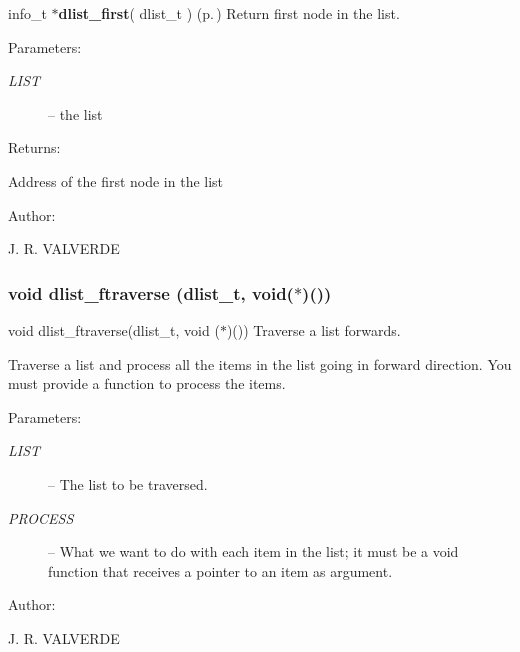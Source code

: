 info\_\-t $\ast${\bf dlist\_\-first}( dlist\_\-t ) {\rm (p.\,\pageref{P__dlist_8h_a10})} Return first node in the list.

\begin{Desc}
\item[Parameters: ]\par
\begin{description}
\item[{\em 
LIST}]-- the list \end{description}
\end{Desc}
\begin{Desc}
\item[Returns: ]\par
Address of the first node in the list\end{Desc}
\begin{Desc}
\item[Author: ]\par
J. R. VALVERDE \end{Desc}
\subsubsection{\setlength{\rightskip}{0pt plus 5cm}void dlist\_\-ftraverse ({\bf dlist\_\-t}, void($\ast$)())}\label{P__dlist_8h_a19}


void dlist\_\-ftraverse(dlist\_\-t, void ($\ast$)()) Traverse a list forwards.

Traverse a list and process all the items in the list going in forward direction. You must provide a function to process the items.\begin{Desc}
\item[Parameters: ]\par
\begin{description}
\item[{\em 
LIST}]-- The list to be traversed. \item[{\em 
PROCESS}]-- What we want to do with each item in the list; it must be a void function that receives a pointer to an item as argument.\end{description}
\end{Desc}
\begin{Desc}
\item[Author: ]\par
J. R. VALVERDE \end{Desc}
